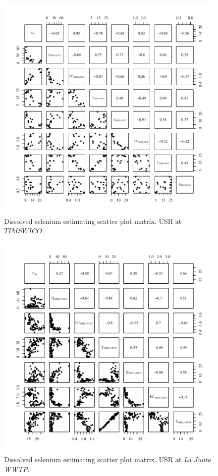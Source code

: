 \begin{figure}[htbp]
	\begin{center}
	\includegraphics[width=6in]{"Figures/Results_USR/Conc Model Full PairsTIM"}
	\caption{Dissolved selenium estimating scatter plot matrix.  USR at $TIMSWICO$.}
	\end{center}
\end{figure}

\begin{figure}[htbp]
	\begin{center}
	\includegraphics[width=6in]{"Figures/Results_USR/Conc Model Full PairsWTP"}
	\caption{Dissolved selenium estimating scatter plot matrix.  USR at \textit{La Junta WWTP}.}
	\end{center}
\end{figure}

